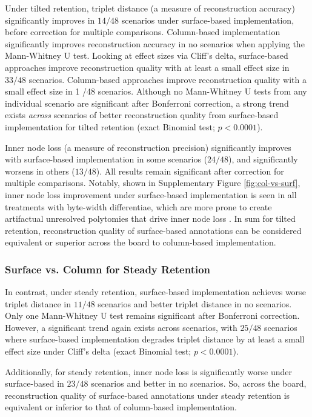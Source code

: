 Under tilted retention, triplet distance (a measure of reconstruction accuracy) significantly improves in $14 / 48$ scenarios under surface-based implementation, before correction for multiple comparisons.
Column-based implementation significantly improves reconstruction accuracy in no scenarios when applying the Mann-Whitney U test.
Looking at effect sizes via Cliff's delta, surface-based approaches improve reconstruction quality with at least a small effect size in $33 / 48$ scenarios.
Column-based approaches improve reconstruction quality with a small effect size in 1 /48 scenarios.
Although no Mann-Whitney U tests from any individual scenario are significant after Bonferroni correction, a strong trend exists \textit{across} scenarios of better reconstruction quality from surface-based implementation for tilted retention (exact Binomial test; $p < 0.0001$).

Inner node loss (a measure of reconstruction precision) significantly improves with surface-based implementation in some scenarios ($24 / 48$), and significantly worsens in others ($13 / 48$).
All results remain significant after correction for multiple comparisons.
Notably, shown in Supplementary Figure \ref{fig:col-vs-surf}, inner node loss improvement under surface-based implementation is seen in all treatments with byte-width differentiae, which are more prone to create artifactual unresolved polytomies that drive inner node loss \citep{moreno2024supplemental}.
In sum for tilted retention, reconstruction quality of surface-based annotations can be considered equivalent or superior across the board to column-based implementation.

\subsubsection{Surface vs. Column for Steady Retention}

In contrast, under steady retention, surface-based implementation achieves worse triplet distance in $11 / 48$ scenarios and better triplet distance in no scenarios.
Only one Mann-Whitney U test remains significant after Bonferroni correction.
However, a significant trend again exists across scenarios, with $25 / 48$ scenarios where surface-based implementation degrades triplet distance by at least a small effect size under Cliff's delta (exact Binomial test; $p < 0.0001$).

Additionally, for steady retention, inner node loss is significantly worse under surface-based in $23 / 48$ scenarios and better in no scenarios.
So, across the board, reconstruction quality of surface-based annotations under steady retention is equivalent or inferior to that of column-based implementation.


